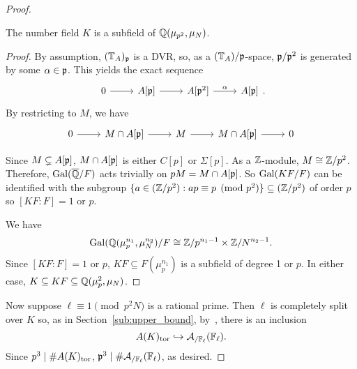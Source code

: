 \documentclass[thesis.tex]{subfiles}
\begin{document}
\begin{proof}
    \begin{lemma}
        The number field $K$ is a subfield of $\mathbb{Q}(\mu_{p^2}, \mu_N)$.
    \end{lemma}
    \begin{proof}
        By assumption, $(\mathbb{T}_A)_{\mathfrak{p}}$ is a DVR\@, so, as a $(\mathbb{T}_A)/\mathfrak{p}$-space,
        $\mathfrak{p}/\mathfrak{p}^2$ is generated by some $\alpha\in \mathfrak{p}$. This yields the exact
        sequence
        \[
            \begin{tikzcd}
                0 \arrow[r] &
                A[\p] \arrow[r] &
                A[\p^2] \arrow[r, "\alpha"] &
                A[\p]
            \end{tikzcd}.
        \]
        By restricting to $M$, we have
        \begin{equation}
            \label{eq:M_Ap}
            \begin{tikzcd}
                0 \arrow[r] &
                M\cap A[\p] \arrow[r] &
                M \arrow[r] &
                M\cap A[\p] \arrow[r] &
                0
            \end{tikzcd} 
        \end{equation}

        Since $M\subsetneq A[\mathfrak{p}]$, $M\cap A[\mathfrak{p}]$ is either $C[p]$ or
        $\Sigma[p]$. As a $\mathbb{Z}$-module, $M\cong \mathbb{Z}/p^2$. Therefore,
        $\operatorname{Gal}(\overline{\mathbb{Q}}/F)$ acts trivially on $pM=M\cap A[\mathfrak{p}]$. So $\operatorname{Gal}(KF/F)$
        can be identified with the subgroup $\{a\in (\mathbb{Z}/p^2):ap\equiv p
        \pmod{p^2}\}\subseteq (\mathbb{Z}/p^2)$ of order $p$ so $[KF:F]=1$ or $p$.

        We have 
        \[
            \operatorname{Gal}(\mathbb{Q}(\mu_p ^{n_1}, \mu_N ^{n_2})/F \cong \mathbb{Z}/p^{n_1-1} \times
            \mathbb{Z}/N^{n_2-1}.
        \]
        Since $[KF:F]=1$ or $p$, $KF\subseteq F(\mu_p ^{n_1})$ is a subfield of
        degree 1 or $p$. In either case, $K\subseteq KF \subseteq \mathbb{Q}(\mu_p ^2,
        \mu_N)$.
    \end{proof}

    Now suppose $\ell\equiv 1\pmod{p^2 N}$ is a rational prime. Then $\ell$ is
    completely split over $K$ so, as in Section~\ref{sub:upper_bound},
    by~\cite[Appendix]{katz:galois}, there is an inclusion
    \[
        A(K)_{\mathrm{tor}}\hookrightarrow \mathcal{A}_{/\mathbb{F}_\ell}(\mathbb{F}_\ell).
    \]
    Since $p^3\mid \#A(K)_{\mathrm{tor}}$, $\mathfrak{p}^3\mid \#\mathcal{A}_{/\mathbb{F}_\ell}(\mathbb{F}_\ell)$,
    as desired.
\end{proof}
\end{document}
